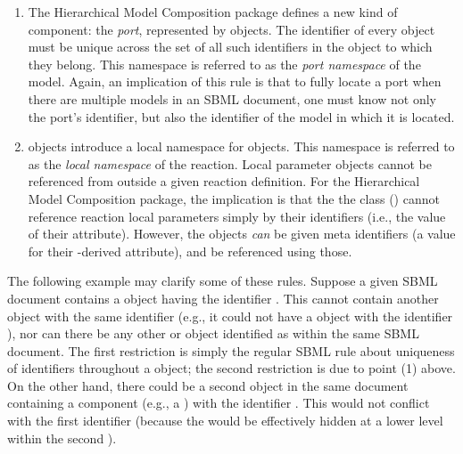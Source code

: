 \begin{enumerate}
\item The Hierarchical Model Composition package defines a new kind of component: the \emph{port}, represented by \Port objects.  The identifier of every \Port object must be unique across the set of all such identifiers in the \Model object to which they belong.  This namespace is referred to as the \emph{port namespace} of the model. Again, an implication of this rule is that to fully locate a port when there are multiple models in an SBML document, one must know not only the port's identifier, but also the identifier of the model in which it is located.

\item \Reaction objects introduce a local namespace for \LocalParameter objects.  This namespace is referred to as the \emph{local namespace} of the reaction.  Local parameter objects cannot be referenced from outside a given reaction definition.  For the Hierarchical Model Composition package, the implication is that the the \SBaseRef class () cannot reference reaction local parameters simply by their identifiers (i.e., the value of their  attribute).  However, the \LocalParameter objects \emph{can} be given meta identifiers (a value for their \SBase-derived  attribute), and be referenced using those.

% 


\end{enumerate}

The following example may clarify some of these rules.  Suppose a given SBML document contains a \Model object having the identifier . This \Model cannot contain another object with the same identifier (e.g., it could not have a \Parameter object with the identifier ), nor can there be any other \Model or \ExternalModelDefinition object identified as  within the same SBML document.  The first restriction is simply the regular SBML rule about uniqueness of identifiers throughout a \Model object; the second restriction is due to point (1) above.  On the other hand, there could be a second \Model object in the same document containing a component (e.g., a \Parameter) with the identifier .  This would not conflict with the first \Model identifier (because the \Parameter would be effectively hidden at a lower level within the second \Model).
